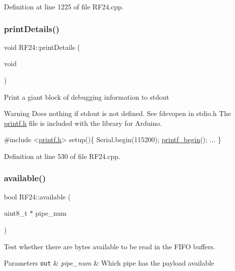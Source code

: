 Definition at line 1225 of file R\+F24.\+cpp.

\mbox{\label{classRF24_adc95213ed4c8569a90eb33122e16cea6}} 
\subsubsection{\texorpdfstring{print\+Details()}{printDetails()}}
{\footnotesize\ttfamily void R\+F24\+::print\+Details (\begin{DoxyParamCaption}\item[{void}]{ }\end{DoxyParamCaption})}

Print a giant block of debugging information to stdout

\begin{DoxyWarning}{Warning}
Does nothing if stdout is not defined. See fdevopen in stdio.\+h The \hyperlink{printf_8h}{printf.\+h} file is included with the library for Arduino. 
\begin{DoxyCode}
\textcolor{preprocessor}{#include <\hyperlink{printf_8h}{printf.h}>}
setup()\{
 Serial.begin(115200);
 \hyperlink{printf_8h_afc0d9ca32710dff550ebe56ab6b39d23}{printf\_begin}();
 ...
\}
\end{DoxyCode}
 
\end{DoxyWarning}


Definition at line 530 of file R\+F24.\+cpp.

\mbox{\label{classRF24_ace7dd139fabc16b77cb8325faa07620f}} 
\subsubsection{\texorpdfstring{available()}{available()}\hspace{0.1cm}{\footnotesize\ttfamily [2/2]}}
{\footnotesize\ttfamily bool R\+F24\+::available (\begin{DoxyParamCaption}\item[{uint8\+\_\+t $\ast$}]{pipe\+\_\+num }\end{DoxyParamCaption})}

Test whether there are bytes available to be read in the F\+I\+FO buffers.


\begin{DoxyParams}[1]{Parameters}
\mbox{\tt out}  & {\em pipe\+\_\+num} & Which pipe has the payload available\\
\hline
\end{DoxyParams}


